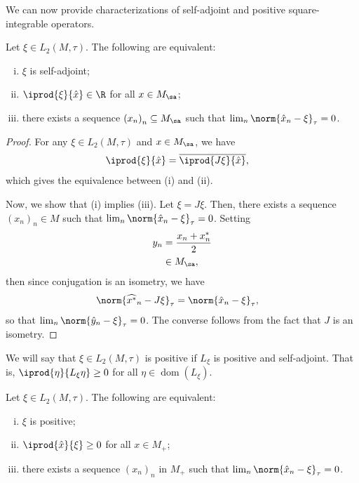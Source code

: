 \documentclass[10pt]{mypackage}
\begin{document}
We can now provide characterizations of self-adjoint and positive square-integrable operators.
\begin{proposition}
  Let $\xi\in L_2\left( M,\tau \right)$. The following are equivalent:
  \begin{enumerate}[(i)]
    \item $\xi$ is self-adjoint;
    \item $ \iprod{\xi}{\hat{x}}\in \R $ for all $x\in M_{\sa}$;
    \item there exists a sequence $\left( x_n \right)_n\subseteq M_{\sa}$ such that $\lim_{n}\norm{\hat{x}_n-\xi}_{\tau} = 0$.
  \end{enumerate}
\end{proposition}
\begin{proof}
  For any $\xi\in L_2\left( M,\tau \right)$ and $x\in M_{\sa}$, we have
  \begin{align*}
    \iprod{\xi}{\hat{x}} &= \overline{ \iprod{J\xi}{\hat{x}} },
  \end{align*}
  which gives the equivalence between (i) and (ii).

  Now, we show that (i) implies (iii). Let $\xi = J\xi$. Then, there exists a sequence $\left( x_n \right)_n\in M$ such that $\lim_{n}\norm{\hat{x}_n-\xi}_{\tau} = 0$. Setting
  \begin{align*}
    y_n &= \frac{x_n + x_n^{\ast}}{2}\\
        &\in M_{\sa},
  \end{align*}
  then since conjugation is an isometry, we have
  \begin{align*}
    \norm{\widehat{x^{\ast}}_n-J\xi}_{\tau} &= \norm{\hat{x}_n-\xi}_{\tau},
  \end{align*}
  so that $\lim_{n}\norm{\hat{y}_n-\xi}_{\tau} = 0$. The converse follows from the fact that $J$ is an isometry.
\end{proof}
We will say that $\xi\in L_2\left( M,\tau \right)$ is positive if $L_{\xi}$ is positive and self-adjoint. That is, $ \iprod{\eta}{L_{\xi}\eta} \geq 0 $ for all $\eta\in \operatorname{dom}\left( L_{\xi} \right)$.
\begin{proposition}
  Let $\xi\in L_2\left( M,\tau \right)$. The following are equivalent:
  \begin{enumerate}[(i)]
    \item $\xi$ is positive;
    \item $ \iprod{\hat{x}}{\xi} \geq 0 $ for all $x\in M_{+}$;
    \item there exists a sequence $\left( x_n \right)_n$ in $M_{+}$ such that $\lim_{n}\norm{\hat{x}_n-\xi}_{\tau} = 0$.
  \end{enumerate}
\end{proposition}
\end{document}
